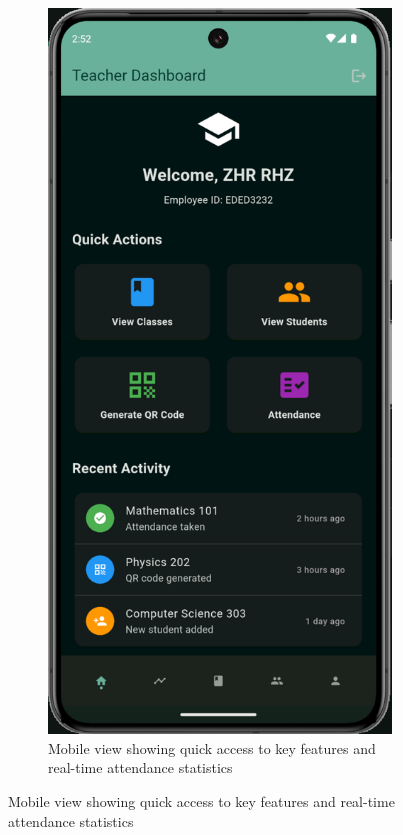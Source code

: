\begin{figure}[H]
\begin{subfigure}[b]{0.48\textwidth}
        \includegraphics[width=\textwidth]{images/rachid/teacher-side-home.png}
        \caption{Mobile view showing quick access to key features and real-time attendance statistics}

\end{subfigure}
\end{figure}

